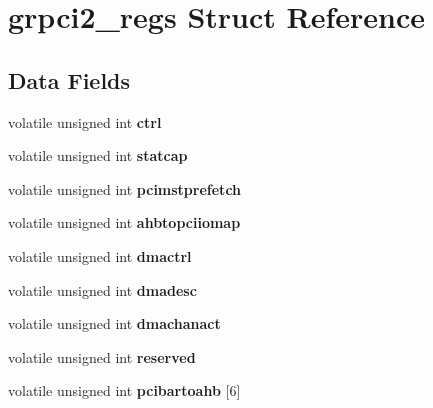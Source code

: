 \hypertarget{structgrpci2__regs}{}\section{grpci2\+\_\+regs Struct Reference}
\label{structgrpci2__regs}
\subsection*{Data Fields}
\begin{DoxyCompactItemize}
\item 
\mbox{\label{structgrpci2__regs_abb2831156d620eb4e1821cc97988ce5b}} 
volatile unsigned int {\bfseries ctrl}
\item 
\mbox{\label{structgrpci2__regs_aaeb3cf614c65413ae10a64200b841e2e}} 
volatile unsigned int {\bfseries statcap}
\item 
\mbox{\label{structgrpci2__regs_a04e04409ce0159a4c24855eda60ce030}} 
volatile unsigned int {\bfseries pcimstprefetch}
\item 
\mbox{\label{structgrpci2__regs_a7477575648b1b5616b90906e3f3bb1c3}} 
volatile unsigned int {\bfseries ahbtopciiomap}
\item 
\mbox{\label{structgrpci2__regs_a3d80b32453415b7181cdefdf7b0f474f}} 
volatile unsigned int {\bfseries dmactrl}
\item 
\mbox{\label{structgrpci2__regs_afef7d1a4d3811aafe4e57c76c19dd843}} 
volatile unsigned int {\bfseries dmadesc}
\item 
\mbox{\label{structgrpci2__regs_ab48270398edeeffb86efd5d6c8853ed5}} 
volatile unsigned int {\bfseries dmachanact}
\item 
\mbox{\label{structgrpci2__regs_aa94693278ef4b325a1f42d6a84dafa02}} 
volatile unsigned int {\bfseries reserved}
\item 
\mbox{\label{structgrpci2__regs_a7078849bb5202286b2e1d871d02fd5ce}} 
volatile unsigned int {\bfseries pcibartoahb} \mbox{[}6\mbox{]}

\end{DoxyCompactItemize}
